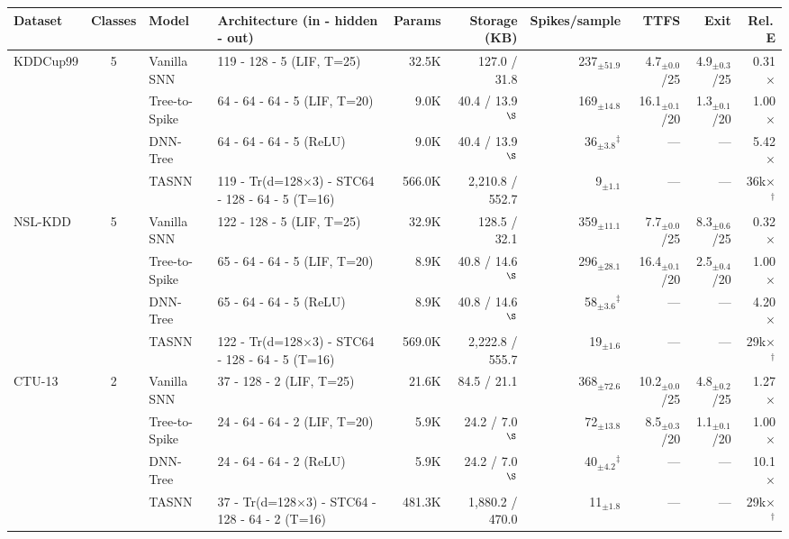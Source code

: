 \begin{table}[!ht]
\label{tab:architecture_full}
{\scriptsize
\begin{tabular}{l c l l r r r r r r}
\toprule
\textbf{Dataset} & \textbf{Classes} & \textbf{Model} & \textbf{Architecture (in - hidden - out)} & \textbf{Params} & \textbf{Storage (KB)} & \textbf{Spikes/sample} & \textbf{TTFS} & \textbf{Exit} & \textbf{Rel.\,E} \\
\midrule
\multirow{4}{*}{KDDCup99} & \multirow{4}{*}{5}
  & Vanilla SNN   & 119 - 128 - 5 (LIF, T=25) & 32.5K & 127.0 / 31.8 & 237$_{\pm51.9}$ & 4.7$_{\pm0.0}$/25 & 4.9$_{\pm0.3}$/25 & 0.31$\times$ \\
& & Tree-to-Spike & 64 - 64 - 64 - 5 (LIF, T=20) & 9.0K & 40.4 / 13.9$^{\S}$ & 169$_{\pm14.8}$ & 16.1$_{\pm0.1}$/20 & 1.3$_{\pm0.1}$/20 & 1.00$\times$ \\
& & DNN-Tree      & 64 - 64 - 64 - 5 (ReLU) & 9.0K & 40.4 / 13.9$^{\S}$ & 36$_{\pm3.8}$$^\ddagger$ & --- & --- & 5.42$\times$ \\
& & TASNN         & 119 - Tr(d=128$\times$3) - STC64 - 128 - 64 - 5 (T=16) & 566.0K & 2,210.8 / 552.7 & 9$_{\pm1.1}$ & --- & --- & 36k$\times$$^\dagger$ \\
\midrule
\multirow{4}{*}{NSL-KDD} & \multirow{4}{*}{5}
  & Vanilla SNN   & 122 - 128 - 5 (LIF, T=25) & 32.9K & 128.5 / 32.1 & 359$_{\pm11.1}$ & 7.7$_{\pm0.0}$/25 & 8.3$_{\pm0.6}$/25 & 0.32$\times$ \\
& & Tree-to-Spike & 65 - 64 - 64 - 5 (LIF, T=20) & 8.9K & 40.8 / 14.6$^{\S}$ & 296$_{\pm28.1}$ & 16.4$_{\pm0.1}$/20 & 2.5$_{\pm0.4}$/20 & 1.00$\times$ \\
& & DNN-Tree      & 65 - 64 - 64 - 5 (ReLU) & 8.9K & 40.8 / 14.6$^{\S}$ & 58$_{\pm3.6}$$^\ddagger$ & --- & --- & 4.20$\times$ \\
& & TASNN         & 122 - Tr(d=128$\times$3) - STC64 - 128 - 64 - 5 (T=16) & 569.0K & 2,222.8 / 555.7 & 19$_{\pm1.6}$ & --- & --- & 29k$\times$$^\dagger$ \\
\midrule
\multirow{4}{*}{CTU-13} & \multirow{4}{*}{2}
  & Vanilla SNN   & 37 - 128 - 2 (LIF, T=25) & 21.6K & 84.5 / 21.1 & 368$_{\pm72.6}$ & 10.2$_{\pm0.0}$/25 & 4.8$_{\pm0.2}$/25 & 1.27$\times$ \\
& & Tree-to-Spike & 24 - 64 - 64 - 2 (LIF, T=20) & 5.9K & 24.2 / 7.0$^{\S}$ & 72$_{\pm13.8}$ & 8.5$_{\pm0.3}$/20 & 1.1$_{\pm0.1}$/20 & 1.00$\times$ \\
& & DNN-Tree      & 24 - 64 - 64 - 2 (ReLU) & 5.9K & 24.2 / 7.0$^{\S}$ & 40$_{\pm4.2}$$^\ddagger$ & --- & --- & 10.1$\times$ \\
& & TASNN         & 37 - Tr(d=128$\times$3) - STC64 - 128 - 64 - 2 (T=16) & 481.3K & 1,880.2 / 470.0 & 11$_{\pm1.8}$ & --- & --- & 29k$\times$$^\dagger$ \\

\end{tabular}}
\end{table}
